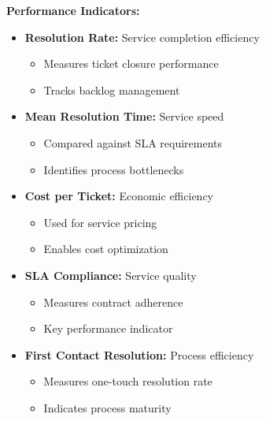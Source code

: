 \documentclass[12pt,a4paper]{article}
\newenvironment{explanation}
{\begin{mdframed}[style=explanationstyle,frametitle={Explanation}]}
{\end{mdframed}}
\begin{document}
\begin{explanation}
\textbf{Performance Indicators:}
\begin{itemize}
    \item \textbf{Resolution Rate:} Service completion efficiency
        \begin{itemize}
            \item Measures ticket closure performance
            \item Tracks backlog management
        \end{itemize}
    \item \textbf{Mean Resolution Time:} Service speed
        \begin{itemize}
            \item Compared against SLA requirements
            \item Identifies process bottlenecks
        \end{itemize}
    \item \textbf{Cost per Ticket:} Economic efficiency
        \begin{itemize}
            \item Used for service pricing
            \item Enables cost optimization
        \end{itemize}
    \item \textbf{SLA Compliance:} Service quality
        \begin{itemize}
            \item Measures contract adherence
            \item Key performance indicator
        \end{itemize}
    \item \textbf{First Contact Resolution:} Process efficiency
        \begin{itemize}
            \item Measures one-touch resolution rate
            \item Indicates process maturity
        \end{itemize}
\end{itemize}
\end{explanation}
\end{document}
